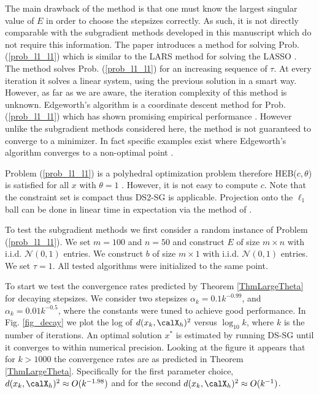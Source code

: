 The main drawback of the method is that one must know the largest singular value of $E$ in order to choose the stepsizes correctly. As such, it is not directly comparable with the subgradient methods developed in this manuscript which do not require this information. The paper \cite{wang2006regularized} introduces a method for solving Prob. (\ref{prob_l1_l1}) which is similar to the LARS method for solving the LASSO \cite{efron2004least}. The method solves Prob. (\ref{prob_l1_l1}) for an increasing sequence of $\tau$. At every iteration it solves a linear system, using the previous solution in a smart way. However, as far as we are aware, the iteration complexity of this method is unknown. Edgeworth's algorithm is a coordinate descent method for Prob. (\ref{prob_l1_l1}) which has shown promising empirical performance \cite{wu2008coordinate}. However unlike the subgradient methods considered here, the method is not guaranteed to converge to a minimizer. In fact specific examples exist where Edgeworth's algorithm converges to a non-optimal point \cite{li2004maximum}. %

Problem (\ref{prob_l1_l1}) is a polyhedral optimization problem therefore HEB($c,\theta$) is satisfied for all $x$ with $\theta=1$ \cite{yang2015rsg}. However, it is not easy to compute $c$. Note that the constraint set is compact thus DS2-SG is applicable. Projection onto the $\ell_1$ ball can be done in linear time in expectation via the method of \cite{duchi2008efficient}. 

To test the subgradient methods we first consider a random instance of Problem (\ref{prob_l1_l1}). We set $m=100$ and $n=50$ and construct $E$ of size $m\times n$ with i.i.d. $\mathcal{N}(0,1)$ entries. We construct $b$ of size $m\times 1$ with  i.i.d. $\mathcal{N}(0,1)$ entries. We set $\tau=1$. All tested algorithms were initialized to the same point.

To start we test the convergence rates predicted by Theorem \ref{ThmLargeTheta} for decaying stepsizes. We consider two stepsizes $\alpha_k = 0.1 k^{-0.99}$, and $\alpha_k = 0.01 k^{-0.5}$, where the constants were tuned to achieve good performance. In Fig. \ref{fig_decay} we plot the log of $d(x_k,\calX_h)^2$ versus $\log_{10} k$, where $k$ is the number of iterations. An optimal solution $x^*$ is estimated by running DS-SG until it converges to within numerical precision. Looking at the figure it appears that for $k>1000$ the convergence rates are as predicted in Theorem \ref{ThmLargeTheta}. Specifically for the first parameter choice, $d(x_k,\calX_h)^2 \approx O(k^{-1.98})$ and for the second $d(x_k,\calX_h)^2 \approx O(k^{-1})$.

